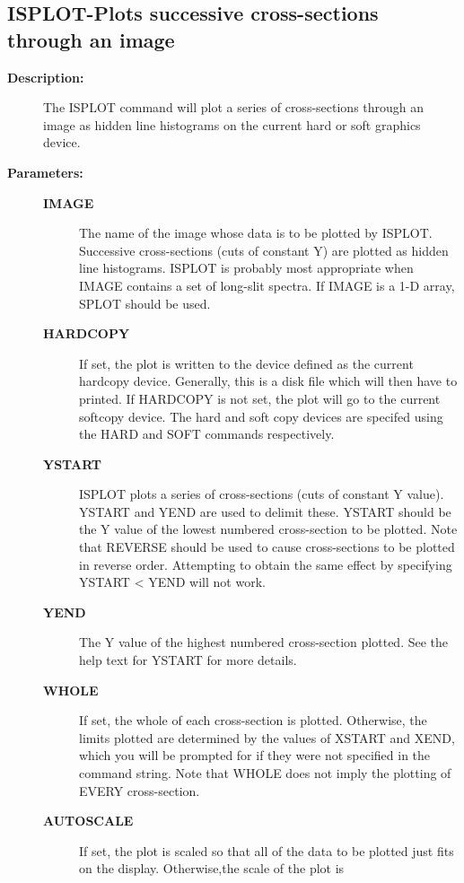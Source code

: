 \subsection{ISPLOT-\label{ISPLOT}Plots successive cross-sections through an image}
\begin{description}

\item [{\bf Description:}]
 The ISPLOT command will plot a series of cross-sections
 through an image as hidden line histograms on the current
 hard or soft graphics device.

\item [{\bf Parameters:}]
\begin{description}
\item [{\bf IMAGE}]
 The name of the image whose data is to be plotted by ISPLOT.
 Successive cross-sections (cuts of constant Y) are plotted as hidden
 line histograms.  ISPLOT is probably most appropriate when IMAGE
 contains a set of long-slit spectra.  If IMAGE is a 1-D array, SPLOT
 should be used.
\item [{\bf HARDCOPY}]
 If set, the plot is written to the device defined as the
 current hardcopy device.  Generally, this is a disk file
 which will then have to printed.  If HARDCOPY is not set,
 the plot will go to the current softcopy device.  The hard
 and soft copy devices are specifed using the HARD and SOFT
 commands respectively.
\item [{\bf YSTART}]
 ISPLOT plots a series of cross-sections (cuts of constant Y value).
 YSTART and YEND are used to delimit these.  YSTART should be the Y
 value of the lowest numbered cross-section to be plotted.  Note that
 REVERSE should be used to cause cross-sections to be plotted in
 reverse order.  Attempting to obtain the same effect by specifying
 YSTART < YEND will not work.
\item [{\bf YEND}]
 The Y value of the highest numbered cross-section plotted.
 See the help text for YSTART for more details.
\item [{\bf WHOLE}]
 If set, the whole of each cross-section is plotted.
 Otherwise, the limits plotted are determined by the values of XSTART
 and XEND, which you will be prompted for if they were not specified
 in the command string.  Note that WHOLE does not imply the plotting
 of EVERY cross-section.
\item [{\bf AUTOSCALE}]
 If set, the plot is scaled so that all of the data to be plotted
 just fits on the display.  Otherwise,the scale of the plot is

\end{description}
\end{description}
